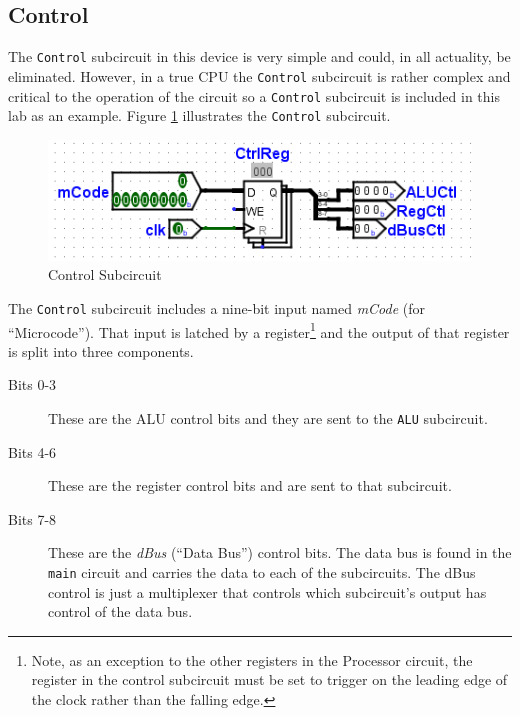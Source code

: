 \subsection{Control}

The \lstinline[columns=fixed]|Control| subcircuit in this device is very simple and could, in all actuality, be eliminated. However, in a true \ac{CPU} the \lstinline[columns=fixed]|Control| subcircuit is rather complex and critical to the operation of the circuit so a \lstinline[columns=fixed]|Control| subcircuit is included in this lab as an example. Figure \ref{fig:proc-05} illustrates the \lstinline[columns=fixed]|Control| subcircuit.

\begin{figure}[H]
	\centering
	\includegraphics[width=\maxwidth{.95\linewidth}]{gfx/proc-05}
	\caption{Control Subcircuit}
	\label{fig:proc-05}
\end{figure}

The \lstinline[columns=fixed]|Control| subcircuit includes a nine-bit input named \textit{mCode} (for ``Microcode''). That input is latched by a register\footnote{Note, as an exception to the other registers in the Processor circuit, the register in the control subcircuit must be set to trigger on the leading edge of the clock rather than the falling edge.} and the output of that register is split into three components.

\begin{description}
	\item[Bits 0-3] These are the \ac{ALU} control bits and they are sent to the \lstinline[columns=fixed]|ALU| subcircuit.
	\item[Bits 4-6] These are the register control bits and are sent to that subcircuit.
	\item[Bits 7-8] These are the \textit{dBus} (``Data Bus'') control bits. The data bus is found in the \lstinline[columns=fixed]|main| circuit and carries the data to each of the subcircuits. The dBus control is just a multiplexer that controls which subcircuit's output has control of the data bus.
\end{description}


